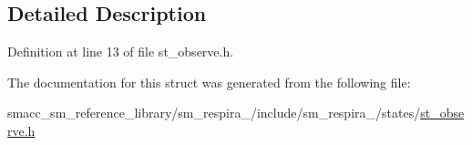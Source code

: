 \subsection{Detailed Description}


Definition at line 13 of file st\+\_\+observe.\+h.



The documentation for this struct was generated from the following file\+:\begin{DoxyCompactItemize}
\item 
smacc\+\_\+sm\+\_\+reference\+\_\+library/sm\+\_\+respira\+\_/include/sm\+\_\+respira\+\_/states/\hyperlink{sm__respira__1_2include_2sm__respira__1_2states_2st__observe_8h}{st\+\_\+observe.\+h}\end{DoxyCompactItemize}
